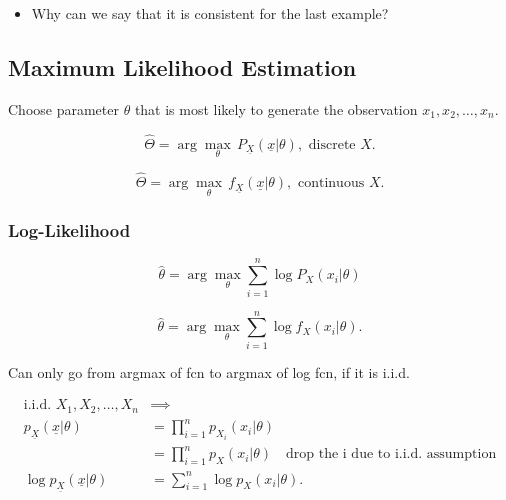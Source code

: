 \begin{faq}
    \begin{itemize}
        \item Why can we say that it is consistent for the last example?
    \end{itemize}
\end{faq}

\subsection{Maximum Likelihood Estimation}
\begin{motivation}
    Choose parameter $\theta$ that is most likely to generate the observation $x_1,x_2,\ldots,x_n$.
\end{motivation}

\begin{definition}
    \begin{equation}
        \hat{\Theta} = \arg\max_\theta \, P_{\underline{X}}(\underline{x}|\theta), \text{ discrete } X.
    \end{equation}
        
    \begin{equation}
        \hat{\Theta} = \arg\max_\theta \, f_{\underline{X}}(\underline{x}|\theta), \text{ continuous } X.
    \end{equation}
        
\end{definition}

\subsubsection{Log-Likelihood}
\begin{definition}
    \begin{equation}
        \hat{\theta} = \arg\max_\theta \sum_{i=1}^n \log P_X(x_i|\theta) 
    \end{equation}

    \begin{equation}
        \hat{\theta} = \arg\max_\theta \sum_{i=1}^n \log f_X(x_i|\theta).
    \end{equation}    
\end{definition}

\begin{warning}
    Can only go from argmax of fcn to argmax of log fcn, if it is i.i.d. 
\end{warning}

\begin{derivation}
    \begin{align*}
        \text{i.i.d. } X_1, X_2, \dots, X_n &\implies \\
        p_{\underline{X}}(\underline{x} | \theta) &= \prod_{i=1}^n p_{X_i}(x_i | \theta) \\
        &= \prod_{i=1}^n p_X(x_i | \theta) \quad \text{drop the i due to i.i.d. assumption}\\
        \log p_{\underline{X}}(\underline{x} | \theta) &= \sum_{i=1}^n \log p_X(x_i | \theta).
    \end{align*}
\end{derivation}

